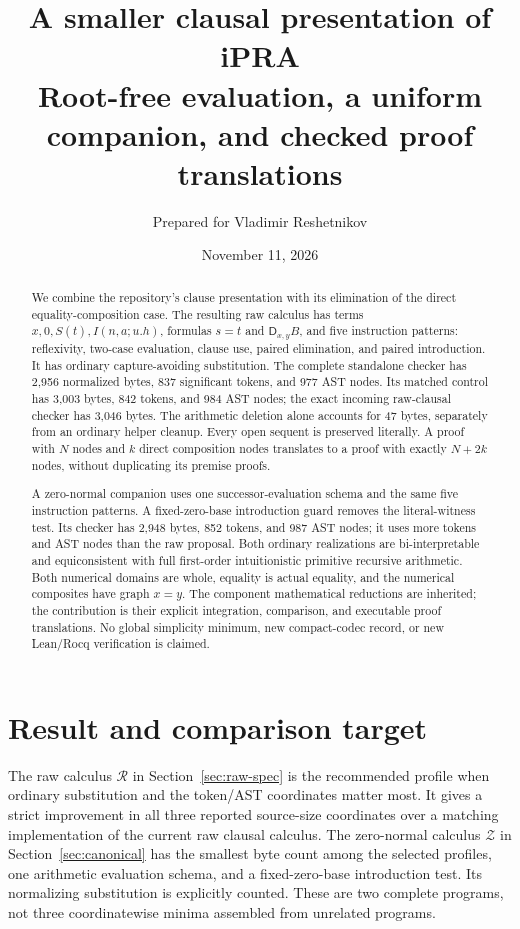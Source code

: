 \documentclass[11pt]{article}
\title{A smaller clausal presentation of iPRA\\[4pt]
  \large Root-free evaluation, a uniform companion, and checked proof translations}
\author{Prepared for Vladimir Reshetnikov}
\date{November 11, 2026}
\theoremstyle{definition}
\newcommand{\Raw}{\mathcal R}
\newcommand{\Can}{\mathcal Z}
\newcommand{\D}{\mathsf D}
\begin{document}
\maketitle
\begin{abstract}
We combine the repository's clause presentation with its elimination of the
direct equality-composition case. The resulting raw calculus has terms
$x,0,S(t),I(n,a;u.h)$, formulas $s=t$ and $\D_{x,y}B$, and five instruction
patterns: reflexivity, two-case evaluation, clause use, paired elimination,
and paired introduction. It has ordinary capture-avoiding substitution.
The complete standalone checker has 2,956 normalized bytes, 837 significant
tokens, and 977 AST nodes. Its matched control has 3,003 bytes, 842 tokens,
and 984 AST nodes; the exact incoming raw-clausal checker has 3,046 bytes.
The arithmetic deletion alone accounts for 47 bytes, separately from an
ordinary helper cleanup. Every open sequent is preserved literally. A
proof with $N$ nodes and $k$ direct composition nodes translates to a proof
with exactly $N+2k$ nodes, without duplicating its premise proofs.

A zero-normal companion uses one successor-evaluation schema and the same
five instruction patterns. A fixed-zero-base introduction guard removes the literal-witness test.
Its checker has 2,948 bytes, 852 tokens, and 987 AST nodes; it uses more
tokens and AST nodes than the raw proposal. Both ordinary realizations are
bi-interpretable and equiconsistent with full first-order intuitionistic
primitive recursive arithmetic. Both numerical domains are whole, equality
is actual equality, and the numerical composites have graph $x=y$.
The component mathematical reductions are inherited; the contribution is
their explicit integration, comparison, and executable proof translations.
No global simplicity minimum, new compact-codec record, or new Lean/Rocq
verification is claimed.
\end{abstract}
\tableofcontents

\section{Result and comparison target}
\label{sec:result}

The raw calculus $\Raw$ in Section~\ref{sec:raw-spec} is the recommended
profile when ordinary substitution and the token/AST coordinates matter most. It gives a strict improvement in all three
reported source-size coordinates over a matching implementation of the
current raw clausal calculus. The zero-normal calculus $\Can$ in Section~\ref{sec:canonical} has the
smallest byte count among the selected profiles, one arithmetic evaluation
schema, and a fixed-zero-base introduction test. Its normalizing substitution
is explicitly counted.
These are two complete programs, not three coordinatewise minima assembled
from unrelated programs.
\end{document}
